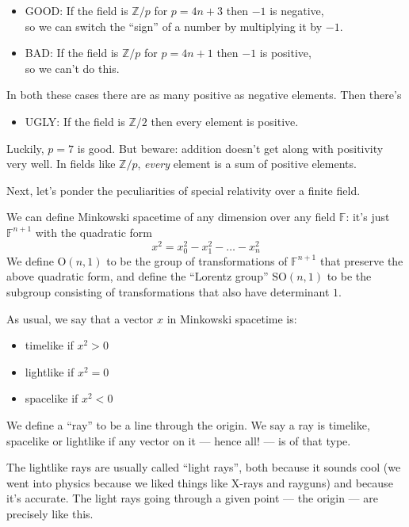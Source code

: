 \documentclass{article}
\def\tightlist{}
\begin{document}
\begin{itemize}
\tightlist
\item
  GOOD: If the field is \(\mathbb{Z}/p\) for \(p = 4n+3\) then \(-1\) is
  negative,\\
  so we can switch the ``sign'' of a number by multiplying it by \(-1\).
\item
  BAD: If the field is \(\mathbb{Z}/p\) for \(p = 4n+1\) then \(-1\) is
  positive,\\
  so we can't do this.
\end{itemize}

In both these cases there are as many positive as negative elements.
Then there's

\begin{itemize}
\tightlist
\item
  UGLY: If the field is \(\mathbb{Z}/2\) then every element is positive.
\end{itemize}

Luckily, \(p = 7\) is good. But beware: addition doesn't get along with
positivity very well. In fields like \(\mathbb{Z}/p\), \emph{every}
element is a sum of positive elements.

Next, let's ponder the peculiarities of special relativity over a finite
field.

We can define Minkowski spacetime of any dimension over any field
\(\mathbb{F}\): it's just \(\mathbb{F}^{n+1}\) with the quadratic form
\[x^2 = x_0^2 - x_1^2 - \ldots - x_n^2\] We define \(\mathrm{O}(n,1)\)
to be the group of transformations of \(\mathbb{F}^{n+1}\) that preserve
the above quadratic form, and define the ``Lorentz group''
\(\mathrm{SO}(n,1)\) to be the subgroup consisting of transformations
that also have determinant \(1\).

As usual, we say that a vector \(x\) in Minkowski spacetime is:

\begin{itemize}
\tightlist
\item
  timelike if \(x^2 > 0\)
\item
  lightlike if \(x^2 = 0\)
\item
  spacelike if \(x^2 < 0\)
\end{itemize}

We define a ``ray'' to be a line through the origin. We say a ray is
timelike, spacelike or lightlike if any vector on it --- hence all! ---
is of that type.

The lightlike rays are usually called ``light rays'', both because it
sounds cool (we went into physics because we liked things like X-rays
and rayguns) and because it's accurate. The light rays going through a
given point --- the origin --- are precisely like this.
\end{document}
